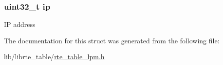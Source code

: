 \subsubsection[{ip}]{\setlength{\rightskip}{0pt plus 5cm}uint32\+\_\+t ip}\label{structrte__table__lpm__key_a69ddb9c845da426f636d9dd0dbed4e7e}
I\+P address 

The documentation for this struct was generated from the following file\+:\begin{DoxyCompactItemize}
\item 
lib/librte\+\_\+table/\hyperlink{rte__table__lpm_8h}{rte\+\_\+table\+\_\+lpm.\+h}\end{DoxyCompactItemize}
